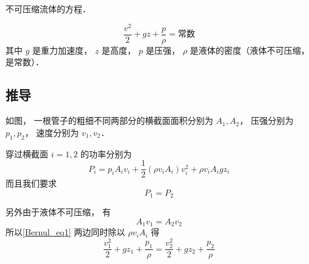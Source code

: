 
\begin{issues}
\issueDraft
\end{issues}

不可压缩流体的方程．

\begin{equation}
\frac{v^2}{2} + gz + \frac{p}{\rho} = \text{常数}
\end{equation}
其中 $g$ 是重力加速度， $z$ 是高度， $p$ 是压强， $\rho$ 是液体的密度（液体不可压缩， 是常数）．

\subsection{推导}
如图， 一根管子的粗细不同两部分的横截面面积分别为 $A_1, A_2$， 压强分别为 $p_1, p_2$， 速度分别为 $v_1, v_2$．

穿过横截面 $i = 1, 2$ 的功率分别为
\begin{equation}
P_i = p_i A_i v_i + \frac{1}{2} (\rho v_i A_i) v_i^2 + \rho v_i A_i g z_i
\end{equation}
而且我们要求
\begin{equation}\label{Bernul_eq1}
P_1 = P_2
\end{equation}

另外由于液体不可压缩， 有
\begin{equation}
A_1v_1 = A_2 v_2
\end{equation}
所以\autoref{Bernul_eq1} 两边同时除以 $\rho v_i A_i$ 得
\begin{equation}
\frac{v_1^2}{2} + gz_1 + \frac{p_1}{\rho} = \frac{v_2^2}{2} + gz_2 + \frac{p_2}{\rho}
\end{equation}
